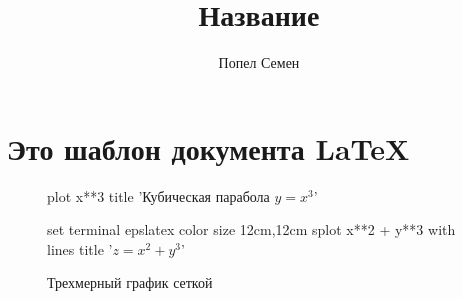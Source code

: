 \documentclass[a4paper,12pt]{article} %
\title{Название}
\author{Попел Семен}
\begin{document}
	
\thispagestyle{fancy}

\maketitle

\begin{abstract}

\end{abstract}

\section{Это шаблон документа \LaTeX}

\begin{figure}[h]
	\centering
	\begin{gnuplot}[terminal=epslatex]
		plot x**3 title 'Кубическая парабола $y = x^3$'
	\end{gnuplot}
\end{figure}

\begin{figure}[h]
	\centering
	\begin{gnuplot}[terminal=epslatex]
		set terminal epslatex color size 12cm,12cm
		splot x**2 + y**3 with lines title '$z = x^2 + y^3$'
	\end{gnuplot}
	\caption{Трехмерный график сеткой}
\end{figure}

\end{document}
